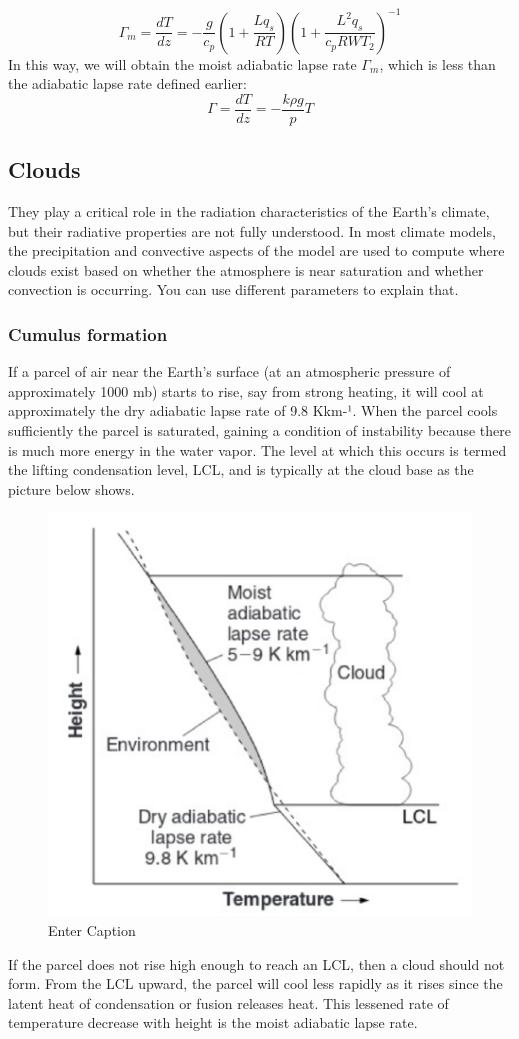 \begin{equation}\label{eq.adiabatic lapse rate}
\Gamma_m= \frac{dT}{dz} = -\frac{g}{c_p} \left( 1 + \frac{L q_s}{R T} \right) \left( 1 + \frac{L^2 q_s}{c_p R W T_2} \right)^{-1}
\end{equation}
In this way, we will obtain the moist adiabatic lapse rate $\Gamma_m$, which is less than the adiabatic lapse rate defined earlier: $$\Gamma=\frac{dT}{dz}=-\frac{k\rho g}{p}T$$



\subsection{Clouds}
They play a critical role in the radiation characteristics of the Earth's climate, but their radiative properties are not fully understood. In most climate models, the precipitation and convective aspects of the model are used to compute where clouds exist based on whether the atmosphere is near saturation and whether convection is occurring. You can use different parameters to explain that.

\subsubsection{Cumulus formation}
If a parcel of air near the Earth's surface (at an atmospheric pressure of approximately 1000 mb) starts to rise, say from strong heating, it will cool at approximately the dry adiabatic lapse rate of 9.8 Kkm-¹. When the parcel cools sufficiently the parcel is saturated, gaining a condition of instability because there is much more energy in the water vapor. The level at which this occurs is termed the lifting condensation level, LCL, and is typically at the cloud base as the picture below shows.
\begin{figure}[htpb]
    \centering
    \includegraphics[width=0.4\linewidth]{uploads/image14.png}
    \caption{Enter Caption}
    \label{fig:enter-label}
\end{figure}
If the parcel does not rise high enough to reach an LCL, then a cloud should not form. From the LCL upward, the parcel will cool less rapidly as it rises since the latent heat of condensation or fusion releases heat. This lessened rate of temperature decrease with height is the moist adiabatic lapse rate.

